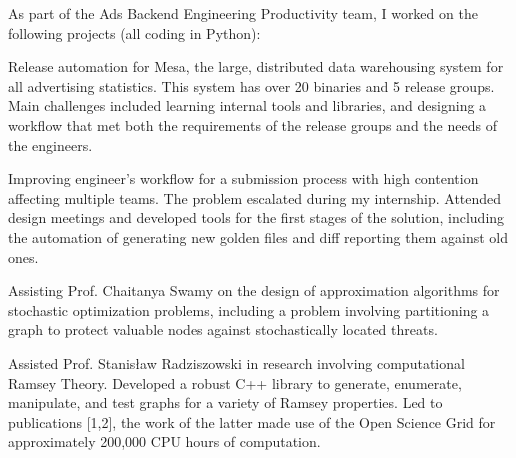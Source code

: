 \documentclass{article}
\begin{document}


\vspace*{-0.25em}

As part of the \textsf{Ads Backend Engineering Productivity} team, I worked on the following
projects (all coding in \textsf{Python}):
\begin{reslist}
  \item Release automation for Mesa, the large, distributed data
    warehousing system for all advertising statistics. This system
    has over 20 binaries and 5 release groups. Main challenges
    included learning internal tools and libraries, and designing a
    workflow that met both the requirements of the release groups and
    the needs of the engineers.
  \item Improving engineer's workflow for a submission process with
    high contention affecting multiple teams. The problem escalated
    during my internship. Attended design meetings and developed tools
    for the first stages of the solution, including the automation of
    generating new golden files and diff reporting them against 
    old ones.
\end{reslist} 

\vspace*{0.25em}

Assisting Prof. Chaitanya Swamy on the design of approximation algorithms
for stochastic optimization problems, including a problem involving
partitioning a graph to protect valuable nodes against stochastically located
threats. 


\vspace*{0.25em}
 
  Assisted Prof. Stanis{\l}aw
Radziszowski in research involving computational Ramsey
Theory. Developed a robust C++ library to generate, enumerate,
manipulate, and test graphs for a variety of Ramsey properties. Led to
publications [1,2], the work of the latter made use of the Open
Science Grid for approximately 200,000 CPU hours of computation.
\end{document}
